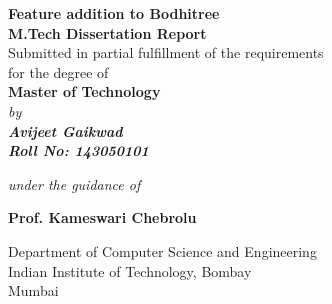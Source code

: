 \documentclass[12pt]{article}
\begin{document}
%
\begin{titlepage}
{\centering     
\large
{\Large\textbf{Feature addition to Bodhitree}}\\
\vspace{1cm}
\textbf{M.Tech Dissertation Report}\vspace{1cm} \\
Submitted in partial fulfillment of the requirements\\
for the degree of
\vspace{.5cm} \\
\textbf{Master of Technology}
\vspace{1cm}
\normalsize
\\ \it{by} \\
\vspace{.5cm}
\rm
{\large \textbf{Avijeet Gaikwad}}\\
{\large \textbf {Roll No: 143050101}}

\vspace{1cm}

{\it{under the guidance of}} \\
\vspace{.5cm}

\hspace{.05cm} {\large \bf {Prof. Kameswari Chebrolu}}\\
\vspace {1cm}

\begin{figure}[h] 
{\par}
\end{figure}

Department of Computer Science and Engineering \\ 
Indian Institute of Technology, Bombay\\
{\centering
\hspace{7cm}Mumbai} 
}
\end{titlepage}
\pagebreak
\cleardoublepage
{}

\tableofcontents
\cleardoublepage
{}
\end{document}
